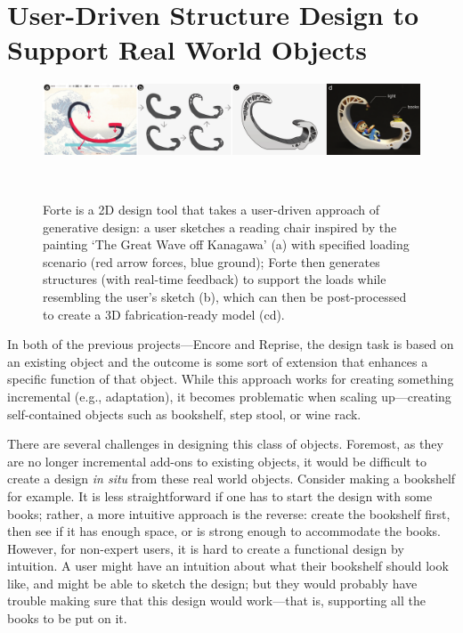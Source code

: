 \chapter{User-Driven Structure Design to Support Real World Objects}

\begin{figure} [h]
   \centering
   \includegraphics[width=1\textwidth]{figures/kanagawa}
   \caption{Forte is a 2D design tool that takes a user-driven approach of generative design: a user sketches a reading chair inspired by the  painting `The Great Wave off Kanagawa' (a) with specified loading scenario (red arrow forces, blue ground); Forte then generates structures (with real-time feedback) to support the loads while resembling the user's sketch (b), which can then be post-processed to create a 3D fabrication-ready model (cd).}~\label{fig:fig1}
\end{figure}

In both of the previous projects---Encore and Reprise, the design task is based on an existing object and the outcome is some sort of extension that enhances a specific function of that object. While this approach works for creating something incremental (e.g., adaptation), it becomes problematic when scaling up---creating self-contained objects such as bookshelf, step stool, or wine rack.

There are several challenges in designing this class of objects. Foremost, as they are no longer incremental add-ons to existing objects, it would be difficult to create a design \textit{in situ} from these real world objects. Consider making a bookshelf for example. It is less straightforward if one has to start the design with some books; rather, a more intuitive approach is the reverse: create the bookshelf first, then see if it has enough space, or is strong enough to accommodate the books. However, for non-expert users, it is hard to create a functional design by intuition. A user might have an intuition about what their bookshelf should look like, and might be able to sketch the design; but they would probably have trouble making sure that this design would work---that is, supporting all the books to be put on it.

